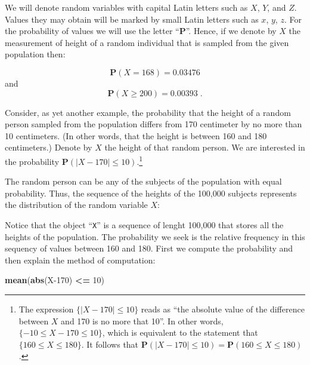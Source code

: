 \documentclass[
]{krantz}
\makeatletter
\newenvironment{Shaded}{\begin{snugshade}}{\end{snugshade}}
\newcommand{\DataTypeTok}[1]{\textcolor[rgb]{0.13,0.29,0.53}{#1}}
\newcommand{\DecValTok}[1]{\textcolor[rgb]{0.00,0.00,0.81}{#1}}
\newcommand{\FloatTok}[1]{\textcolor[rgb]{0.00,0.00,0.81}{#1}}
\newcommand{\KeywordTok}[1]{\textcolor[rgb]{0.13,0.29,0.53}{\textbf{#1}}}
\newcommand{\NormalTok}[1]{#1}
\newcommand{\OperatorTok}[1]{\textcolor[rgb]{0.81,0.36,0.00}{\textbf{#1}}}
\newcommand{\StringTok}[1]{\textcolor[rgb]{0.31,0.60,0.02}{#1}}
\newcommand{\Prob}{\mathbf{P}}
\newenvironment{kframe}{%
\medskip{}
\setlength{\fboxsep}{.8em}
 \def\at@end@of@kframe{}%
 \ifinner\ifhmode%
  \def\at@end@of@kframe{\end{minipage}}%
  \begin{minipage}{\columnwidth}%
 \fi\fi%
 \def\FrameCommand##1{\hskip\@totalleftmargin \hskip-\fboxsep
 \colorbox{shadecolor}{##1}\hskip-\fboxsep
     \hskip-\linewidth \hskip-\@totalleftmargin \hskip\columnwidth}%
 \MakeFramed {\advance\hsize-\width
   \@totalleftmargin\z@ \linewidth\hsize
   \@setminipage}}%
 {\par\unskip\endMakeFramed%
 \at@end@of@kframe}
\renewenvironment{Shaded}{\begin{kframe}}{\end{kframe}}
\theoremstyle{definition}
\theoremstyle{definition}
\theoremstyle{definition}
\theoremstyle{remark}
\makeatother
\begin{document}
We will denote random variables with capital Latin letters such as \(X\),
\(Y\), and \(Z\). Values they may obtain will be marked by small Latin
letters such as \(x\), \(y\), \(z\). For the probability of values we will use
the letter ``\(\Prob\)''. Hence, if we denote by \(X\) the measurement of
height of a random individual that is sampled from the given population
then:

\[\Prob(X = 168) = 0.03476\] and
\[\Prob(X \geq 200) = 0.00393\;.\]

Consider, as yet another example, the probability that the height of a
random person sampled from the population differs from 170 centimeter by
no more than 10 centimeters. (In other words, that the height is between
160 and 180 centimeters.) Denote by \(X\) the height of that random
person. We are interested in the probability
\(\Prob(|X -170| \leq 10)\).\footnote{The expression \(\{|X -170| \leq 10\}\) reads as ``the absolute value
  of the difference between \(X\) and 170 is no more that 10''. In other
  words, \(\{-10 \leq X - 170 \leq 10\}\), which is equivalent to the
  statement that \(\{160 \leq X \leq 180\}\). It follows that
  \(\Prob(|X-170|\leq 10) = \Prob(160\leq X \leq 180)\).}

The random person can be any of the subjects of the population with
equal probability. Thus, the sequence of the heights of the 100,000
subjects represents the distribution of the random variable \(X\):

\begin{Shaded}
\end{Shaded}

Notice that the object ``\texttt{X}'' is a sequence of lenght 100,000 that stores
all the heights of the population. The probability we seek is the
relative frequency in this sequency of values between 160 and 180. First
we compute the probability and then explain the method of computation:

\begin{Shaded}
\begin{Highlighting}[]
\KeywordTok{mean}\NormalTok{(}\KeywordTok{abs}\NormalTok{(X}\DecValTok{-170}\NormalTok{) }\OperatorTok{<=}\StringTok{ }\DecValTok{10}\NormalTok{)}
\end{Highlighting}
\end{Shaded}
\end{document}
